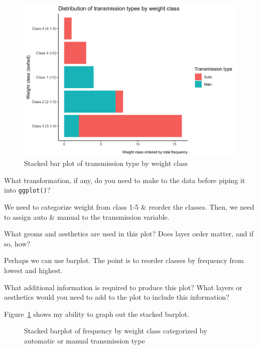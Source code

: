 \documentclass[
  man,
  floatsintext,
  longtable,
  nolmodern,
  notxfonts,
  notimes,
  colorlinks=true,linkcolor=blue,citecolor=blue,urlcolor=blue]{apa7}
\begin{document}
\begin{figure}[H]

\caption{Stacked bar plot of transmission type by weight class}

{\centering \includegraphics{plots/plot6.png}

}

\end{figure}%

What transformation, if any, do you need to make to the data before
piping it into \texttt{ggplot()}?

We need to categorize weight from class 1-5 \& reorder the classes.
Then, we need to assign auto \& manual to the transmission variable.

What geoms and aesthetics are used in this plot? Does layer order
matter, and if so, how?

Perhaps we can use barplot. The point is to reorder classes by frequency
from lowest and highest.

What additional information is required to produce this plot? What
layers or aesthetics would you need to add to the plot to include this
information?

Figure~\ref{fig-plot6-stacked-barplot} shows my ability to graph out the
stacked barplot.

\begin{figure}[H]

\caption{\label{fig-plot6-stacked-barplot}Stacked barplot of frequency
by weight class categorized by automatic or manual transmission type}


\end{figure}%
\end{document}
